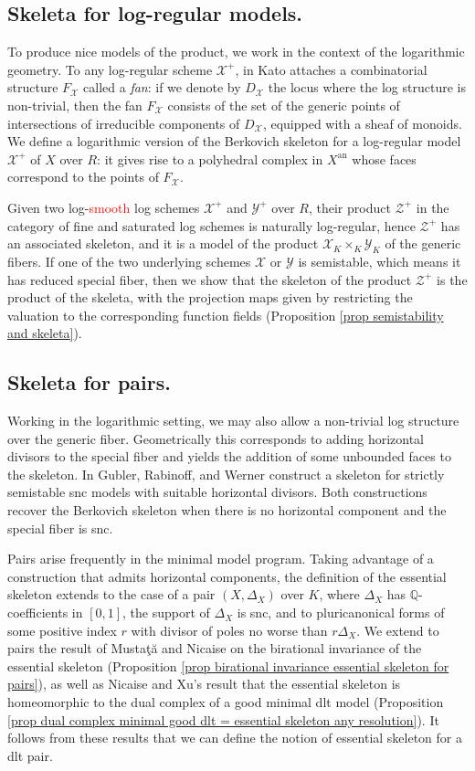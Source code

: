 \documentclass{amsart}%
\numberwithin{equation}{subsection}
\theoremstyle{plain2}
\theoremstyle{definition2}
\theoremstyle{stepstyle}
\theoremstyle{point}
\theoremstyle{subpoint}
\newcommand{\cX}{\ensuremath{\mathscr{X}}}
\newcommand{\cY}{\ensuremath{\mathscr{Y}}}
\newcommand{\cZ}{\ensuremath{\mathscr{Z}}}
\renewcommand{\cY}{\ensuremath{\mathscr{Y}}}
\newcommand{\an}{\mathrm{an}}
\begin{document}
\subsection{Skeleta for log-regular models.} To produce nice models of the product, we work in the context of the logarithmic geometry. To any log-regular scheme $\cX^+$, in \cite{Kato1994a} Kato attaches a combinatorial structure $F_\cX$ called a \emph{fan}: if we denote by $D_\cX$ the locus where the log structure is non-trivial, then the fan $F_\cX$ consists of the set of the generic points of intersections of irreducible components of $D_\cX$, equipped with a sheaf of monoids. We define a logarithmic version of the Berkovich skeleton for a log-regular model $\cX^+$ of $X$ over $R$: it gives rise to a polyhedral complex in $X^\an$ whose faces correspond to the points of $F_\cX$.

Given two log-\textcolor{red}{smooth} log schemes $\cX^+$ and $\cY^+$ over $R$, their product $\cZ^+$ in the category of fine and saturated log schemes is naturally log-regular, hence $\cZ^+$ has an associated skeleton, and it is a model of the product $\cX_K \times_K \cY_K$ of the generic fibers. If one of the two underlying schemes $\cX$ or $\cY$ is semistable, which means it has reduced special fiber, then we show that the skeleton of the product $\cZ^+$ is the product of the skeleta, with the projection maps given by restricting the valuation to the corresponding function fields (Proposition \ref{prop semistability and skeleta}).

\subsection{Skeleta for pairs.} Working in the logarithmic setting, we may also allow a non-trivial log structure over the generic fiber. Geometrically this corresponds to adding horizontal divisors to the special fiber and yields the addition of some unbounded faces to the skeleton. In \cite{GublerRabinoffWerner} Gubler, Rabinoff, and Werner construct a skeleton for strictly semistable snc models with suitable horizontal divisors. Both constructions recover the Berkovich skeleton when there is no horizontal component and the special fiber is snc.

Pairs arise frequently in the minimal model program. Taking advantage of a construction that admits horizontal components, the definition of the essential skeleton extends to the case of a pair $(X,\Delta_X)$ over $K$, where $\Delta_X$ has $\mathbb{Q}$-coefficients in $[0,1]$, the support of $\Delta_X$ is snc, and to pluricanonical forms of some positive index $r$ with divisor of poles no worse than $r\Delta_X$. We extend to pairs the result of Musta{\c{t}}{\u{a}} and Nicaise \cite{MustataNicaise} on the birational invariance of the essential skeleton (Proposition \ref{prop birational invariance essential skeleton for pairs}), as well as Nicaise and Xu's result \cite{NicaiseXu} that the essential skeleton is homeomorphic to the dual complex of a good minimal dlt model (Proposition \ref{prop dual complex minimal good dlt = essential skeleton any resolution}). It follows from these results that we can define the notion of essential skeleton for a dlt pair.
\end{document}

